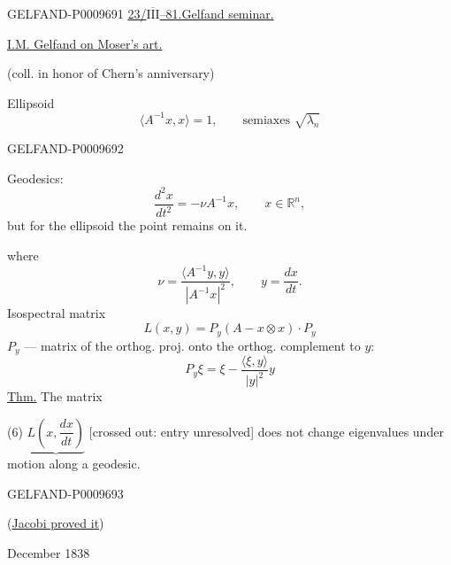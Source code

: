 \begin{GelfandAdjacentEvidence}{GELFAND-P000969}{1}
\underline{23/\underline{\(\overline{\mathrm{III}}\)}--81.}\quad\underline{Gelfand seminar.}

\underline{I.M. Gelfand on Moser’s art.}

(coll. in honor of Chern’s anniversary)

Ellipsoid
\begin{equation*}
 \langle A^{-1}x,x\rangle=1,\qquad\text{semiaxes }\sqrt{\lambda_n}\tag{1}
\end{equation*}
\end{GelfandAdjacentEvidence}
\begin{GelfandAdjacentEvidence}{GELFAND-P000969}{2}


Geodesics:
\begin{equation*}
 \frac{d^2x}{dt^2}=-\nu A^{-1}x,\qquad x\in\mathbb R^n,\tag{2}
\end{equation*}
but for the ellipsoid the point remains on it.

where
\begin{equation*}
 \nu=\frac{\langle A^{-1}y,y\rangle}{|A^{-1}x|^2},\qquad
 y=\frac{dx}{dt}.\tag{3}
\end{equation*}
Isospectral matrix
\begin{equation*}
 L(x,y)=P_y(A-x\otimes x)\cdot P_y\tag{4}
\end{equation*}
$P_y$ --- matrix of the orthog. proj. onto the orthog. complement to $y$:
\begin{equation*}
 P_y\xi=\xi-\frac{\langle\xi,y\rangle}{|y|^2}y\tag{5}
\end{equation*}
\underline{Thm.} The matrix

(6) $\underbrace{L\left(x,\dfrac{dx}{dt}\right)}$
[crossed out: entry unresolved] does not change eigenvalues under motion along a geodesic.

\end{GelfandAdjacentEvidence}
\begin{GelfandAdjacentEvidence}{GELFAND-P000969}{3}


(\underline{Jacobi proved it})

December 1838
\end{GelfandAdjacentEvidence}
